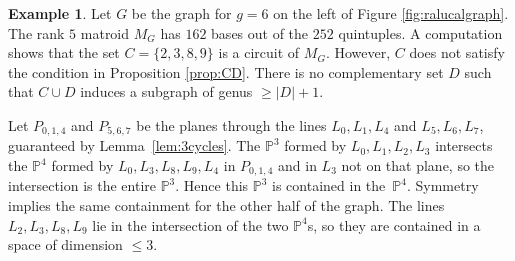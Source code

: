 \documentclass[12pt]{extarticle}
\theoremstyle{definition}
\newtheorem{example}[theorem]{Example}
\numberwithin{theorem}{section}
\theoremstyle{plain}\newtheorem{ithm}{Theorem}
\newcommand{\PP}{\mathbb{P}}
\begin{document}
\begin{example}\label{ex:ralucagraph}
  Let $G$ be the graph for $g=6$ on the left of Figure \ref{fig:ralucalgraph}. %
  The rank $5$ matroid $M_G$ has $162$ bases out of the $252$ quintuples.
  A computation shows that the set $C = \{2,3,8,9\}$ is a circuit of $M_G$. However,
  $C$ does not satisfy the condition in Proposition \ref{prop:CD}.
  There is no complementary set $D$ such that $C \cup D$ induces
  a subgraph of genus $\geq |D|+1$.
  
  Let $P_{0,1,4}$ and $P_{5,6,7}$ be the planes through the lines $L_0,L_1,L_4$ and $L_5,L_6,L_7$,  guaranteed by Lemma~\ref{lem:3cycles}. The $\PP^3$ formed by $L_0,L_1,L_2,L_3$ intersects the $\PP^4$ formed by
  $L_0,L_3,L_8,L_9,L_4$ in $P_{0,1,4}$ and in $L_3$ not on that plane,
  so the intersection is the entire $\PP^3$. Hence
  this $\PP^3$ is contained in the~$\PP^4$. 
  Symmetry implies the same containment for the other half of the graph. The lines $L_2,L_3,L_8,L_9$ lie in the intersection of the two $\PP^4$s, so they are contained in a space of dimension $\leq 3$.
  \end{example}
\end{document}
